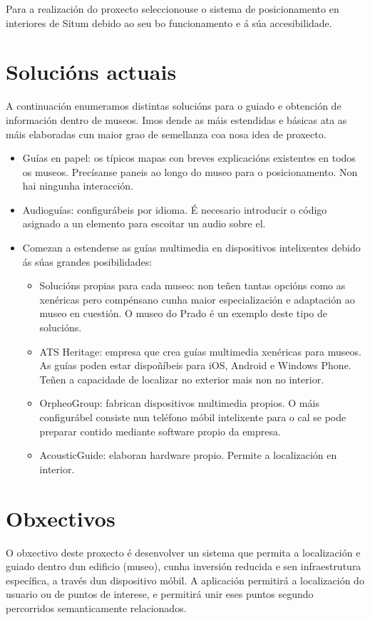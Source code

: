 Para a realización do proxecto seleccionouse o sistema de posicionamento en interiores de Situm debido ao seu bo funcionamento e á súa accesibilidade.

\section{Solucións actuais}

A continuación enumeramos distintas solucións para o guiado e obtención de información dentro de museos. Imos dende as máis estendidas e básicas ata as máis elaboradas cun maior grao de semellanza coa nosa idea de proxecto.
\begin{itemize}
	\item Guías en papel: os típicos mapas con breves explicacións existentes en todos os museos. Precísanse paneis ao longo do museo para o posicionamento. Non hai ningunha interacción.
	\item Audioguías: configurábeis por idioma. É necesario introducir o código asignado a un elemento para escoitar un audio sobre el.
	\item Comezan a estenderse as guías multimedia en dispositivos intelixentes debido ás súas grandes posibilidades:
	\begin{itemize}
		\item Solucións propias para cada museo: non teñen tantas opcións como as xenéricas pero compénsano cunha maior especialización e adaptación ao museo en cuestión. O museo do Prado é un exemplo deste tipo de solucións.
		\item ATS Heritage: empresa que crea guías multimedia xenéricas para museos. As guías poden estar dispoñíbeis para iOS, Android e Windows Phone. Teñen a capacidade de localizar no exterior mais non no interior.
		\item OrpheoGroup: fabrican dispositivos multimedia propios. O máis configurábel consiste nun teléfono móbil intelixente para o cal se pode preparar contido mediante software propio da empresa.
		\item AcousticGuide: elaboran hardware propio. Permite a localización en interior.
	\end{itemize}
\end{itemize}

\section{Obxectivos}

O obxectivo deste proxecto é desenvolver un sistema que permita a localización e guiado dentro dun edificio (museo), cunha inversión reducida e sen infraestrutura específica, a través dun dispositivo móbil. A aplicación permitirá a localización do usuario ou de puntos de interese, e permitirá unir eses puntos segundo percorridos semanticamente relacionados.

